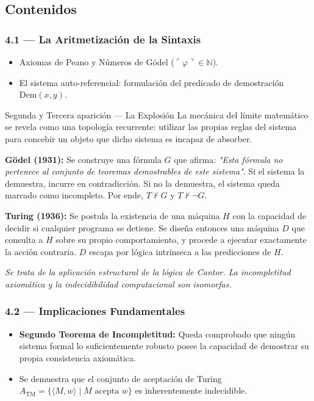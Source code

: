 \documentclass[11pt, letterpaper]{article}
\begin{document}
\subsection{Contenidos}

\subsubsection{4.1 --- La Aritmetizaci\'on de la Sintaxis}
\begin{itemize}
  \item Axiomas de Peano y N\'umeros de G\"odel ($\ulcorner\varphi\urcorner\in\mathbb{N}$).
  \item El sistema auto-referencial: formulaci\'on del predicado de demostraci\'on $\text{Dem}(x,y)$.
\end{itemize}

\begin{diagonal}{Segunda y Tercera aparici\'on --- La Explosi\'on}
La mec\'anica del l\'imite matem\'atico se revela como una topolog\'ia recurrente: utilizar las propias reglas del sistema para concebir un objeto que dicho sistema es incapaz de absorber.

\textbf{G\"odel (1931):} Se construye una f\'ormula $G$ que afirma: \textit{"Esta f\'ormula no pertenece al conjunto de teoremas demostrables de este sistema"}. Si el sistema la demuestra, incurre en contradicci\'on. Si no la demuestra, el sistema queda marcado como incompleto. Por ende, $T \not\vdash G$ y $T \not\vdash \neg G$.

\textbf{Turing (1936):} Se postula la existencia de una m\'aquina $H$ con la capacidad de decidir si cualquier programa se detiene. Se dise\~na entonces una m\'aquina $D$ que consulta a $H$ sobre su propio comportamiento, y procede a ejecutar exactamente la acci\'on contraria. $D$ escapa por l\'ogica intr\'inseca a las predicciones de $H$.

\medskip
\textit{Se trata de la aplicaci\'on estructural de la l\'ogica de Cantor. La incompletitud axiom\'atica y la indecidibilidad computacional son isomorfas.}
\end{diagonal}

\subsubsection{4.2 --- Implicaciones Fundamentales}
\begin{itemize}
  \item \textbf{Segundo Teorema de Incompletitud:} Queda comprobado que ning\'un sistema formal lo suficientemente robusto posee la capacidad de demostrar su propia consistencia axiom\'atica.
  \item Se demuestra que el conjunto de aceptaci\'on de Turing $A_\text{TM}=\{\langle M,w\rangle\mid M\text{ acepta }w\}$ es inherentemente indecidible.
\end{itemize}
\end{document}
